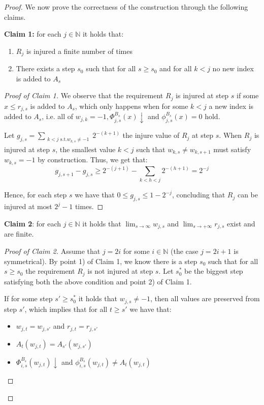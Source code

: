 \documentclass[12pt,a4paper]{article}
\theoremstyle{definition}
\newcommand{\N}{\mathbb{N}}                     %
\begin{document}
\begin{proof}
    We now prove the correctness of the construction through the following claims.

    \textbf{Claim 1:} for each $j \in \N$ it holds that:
    \begin{enumerate}
        \item $R_j$ is injured a finite number of times
        \item There exists a step $s_0$ such that for all $s \geq s_0$ and for all $k < j$ no new index is added to $A_s$
    \end{enumerate}

    \begin{proof}[Proof of Claim 1]
        We observe that the requirement $R_j$ is injured at step $s$ if some $x \leq r_{j,s}$ is added to $A_s$, which only happens when for some $k < j$ a new index is added to $A_s$, i.e. all of $w_{j,k} = -1, \Phi_{j,s}^{B_s} (x) \downarrow$ and $\phi_{j,s}^{B_s}(x) = 0$ hold.

        Let $g_{j,s} = \sum_{\substack{k < j \text{ s.t.} w_{k,s} \neq -1}} 2^{-(k+1)}$ the injure value of $R_j$ at step $s$. When $R_j$ is injured at step $s$, the smallest value $k < j$ such that $w_{k,s} \neq w_{k,s+1}$ must satisfy $w_{k,s} = -1$ by construction. Thus, we get that:
        \[g_{j,s+1} - g_{j,s} \geq 2^{-(j+1)} - \sum_{k < h < j} 2^{-(h+1)} = 2^{-j}\]

        Hence, for each step $s$ we have that $0 \leq g_{j,s} \leq 1-2^{-j}$, concluding that $R_j$ can be injured at most $2^{j}-1$ times.
    \end{proof}

    \textbf{Claim 2}: for each $j \in \N$ it holds that $\lim_{s \to \infty} w_{j,s}$ and $\lim_{s \to +\infty} r_{j,s}$ exist and are finite.

    \begin{proof}[Proof of Claim 2]
        Assume that $j = 2i$ for some $i \in \N$ (the case $j = 2i+1$ is symmetrical). By point 1) of Claim 1, we know there is a step $s_0$ such that for all $s \geq s_0$ the requirement $R_j$ is not injured at step $s$. Let $s_0^*$ be the biggest step satisfying both the above condition and point 2) of Claim 1.
        
        If for some step $s' \geq s_0^*$ it holds that $w_{j,s} \neq -1$, then all values are preserved from step $s'$, which implies that for all $t \geq s'$ we have that:
        \begin{itemize}
            \item $w_{j,t} = w_{j,s'}$ and $r_{j,t} = r_{j,s'}$
            \item $A_t(w_{j,t}) = A_{s'}(w_{j,s'})$
            \item $\Phi_{i, s}^{B_s}(w_{j,t}) \downarrow$ and $\phi_{i, s}^{B_s}(w_{j,t}) \neq A_{t}(w_{j,t})$
        \end{itemize}


\end{proof}
\end{proof}
\end{document}
